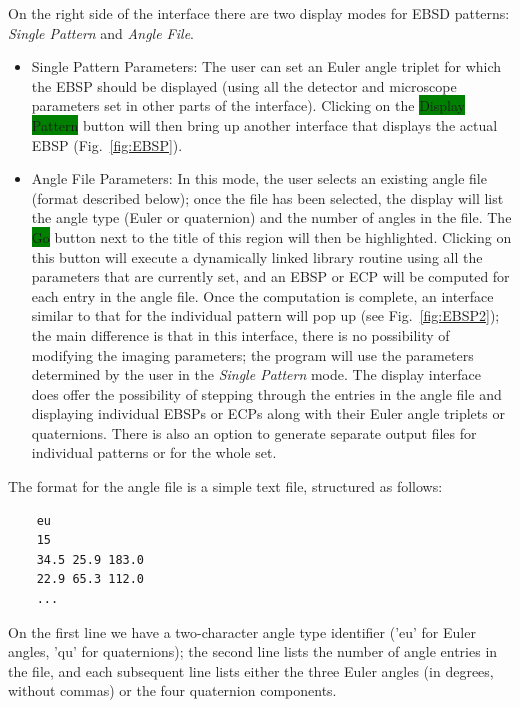 \documentclass[DIV=calc, paper=letter, fontsize=11pt]{scrartcl}	 %
\newcommand{\ctp}{\textsf{EMSoft}}
\newcommand{\button}[1]{\colorbox{green}{\textsf{#1}} button}
\begin{document}
On the right side of the interface there are two display modes for EBSD patterns: \textit{Single Pattern} and \textit{Angle File}.
\begin{itemize}
	\item \textsf{Single Pattern Parameters}: The user can set an Euler angle triplet for which the EBSP should be displayed (using all the detector and microscope
	parameters set in other parts of the interface).  Clicking on the \button{Display Pattern} will then bring up another interface that 
	displays the actual EBSP (Fig.~\ref{fig:EBSP}).  
	\item \textsf{Angle File Parameters}: In this mode, the user selects an existing angle file (format described below); once the file has been 
	selected, the display will list the angle type (Euler or quaternion) and the number of angles in the file.  The \button{Go} next to the 
	title of this region will then be highlighted.  Clicking on this button will execute a dynamically linked library routine using all the parameters 
	that are currently set, and an EBSP or ECP will be computed for each entry in the angle file.  Once the computation is complete, an interface similar
	to that for the individual pattern will pop up (see Fig.~\ref{fig:EBSP2}); the main difference is that in this interface, there is no possibility of modifying the 
	imaging parameters; the program will use the parameters determined by the user in the \textit{Single Pattern} mode.  The display interface
	does offer the possibility of stepping through the entries in the angle file and displaying individual EBSPs or ECPs along with their Euler angle
	triplets or quaternions.  There is also an option to generate separate output files for individual patterns or for the whole set.  
\end{itemize}


The format for the angle file is a simple text file, structured as follows:
\begin{verbatim}
	eu
	15
	34.5 25.9 183.0
	22.9 65.3 112.0
	...
\end{verbatim}
On the first line we have a two-character angle type identifier ('eu' for Euler angles, 'qu' for quaternions); the second line 
lists the number of angle entries in the file, and each subsequent line lists either the three Euler angles (in degrees, without commas)
or the four quaternion components.
\end{document}
